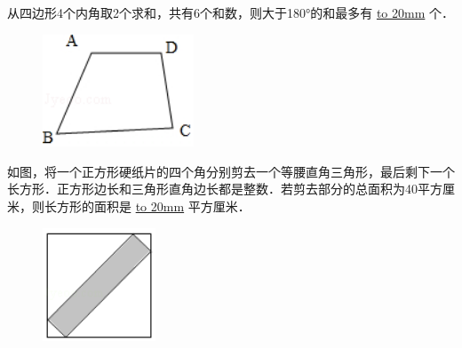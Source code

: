 \item {
    {从四边形4个内角取2个求和，共有6个和数，则大于180°的和最多有 \underline{\hbox to 20mm{}} 个．} 
    \begin{figure}[H] 
        \centering
        \includegraphics[width=0.4\textwidth]{./pics/Chapter_3/11.png}
    \end{figure}
    \vspace{1cm}
}
\item {
    {如图，将一个正方形硬纸片的四个角分别剪去一个等腰直角三角形，最后剩下一个长方形．正方形边长和三角形直角边长都是整数．若剪去部分的总面积为40平方厘米，则长方形的面积是 \underline{\hbox to 20mm{}} 平方厘米．} 
    \begin{figure}[H] 
        \centering
        \includegraphics[width=0.3\textwidth]{./pics/Chapter_3/12.png}
    \end{figure}
    \vspace{1cm}
}

